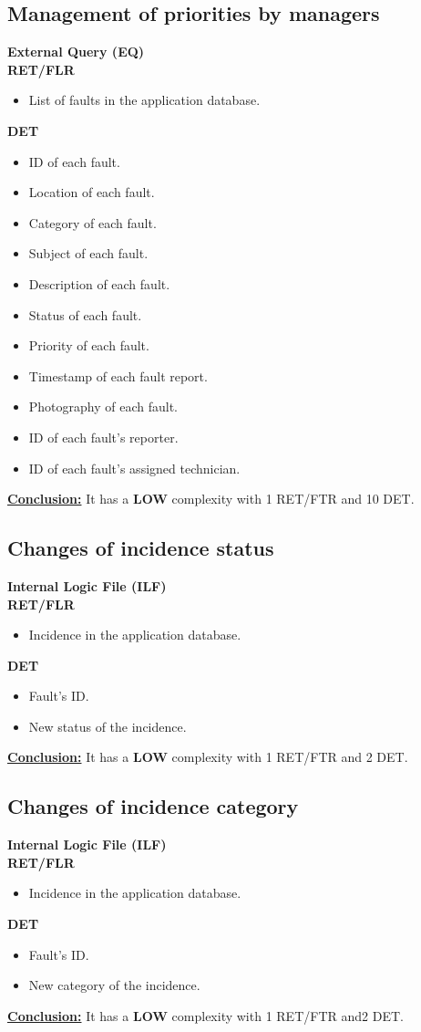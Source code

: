 \subsection{Management of priorities by managers}
\textbf{External Query (EQ)} \\ 
\textbf{RET/FLR}
\begin{itemize}
\item List of faults in the application database.
\end{itemize}
\textbf{DET}
\begin{itemize}
\item ID of each fault.
\item Location of each fault.
\item Category of each fault.
\item Subject of each fault.
\item Description of each fault.
\item Status of each fault.
\item Priority of each fault.
\item Timestamp of each fault report.
\item Photography of each fault.
\item ID of each fault's reporter.
\item ID of each fault's assigned technician.
\end{itemize}
\textbf{\underline{Conclusion:}} It has a \textbf{LOW} complexity with 1 RET/FTR and 10 DET.

\subsection{Changes of incidence status}
\textbf{Internal Logic File (ILF)} \\ 
\textbf{RET/FLR}
\begin{itemize}
\item Incidence in the application database.
\end{itemize}
\textbf{DET}
\begin{itemize}
\item Fault's ID.
\item New status of the incidence.
\end{itemize}
\textbf{\underline{Conclusion:}} It has a \textbf{LOW} complexity with 1 RET/FTR and 2 DET.

\subsection{Changes of incidence category}
\textbf{Internal Logic File (ILF)} \\ 
\textbf{RET/FLR}
\begin{itemize}
\item Incidence in the application database.
\end{itemize}
\textbf{DET}
\begin{itemize}
\item Fault's ID.
\item New category of the incidence.
\end{itemize}
\textbf{\underline{Conclusion:}} It has a \textbf{LOW} complexity with 1 RET/FTR and2 DET.

